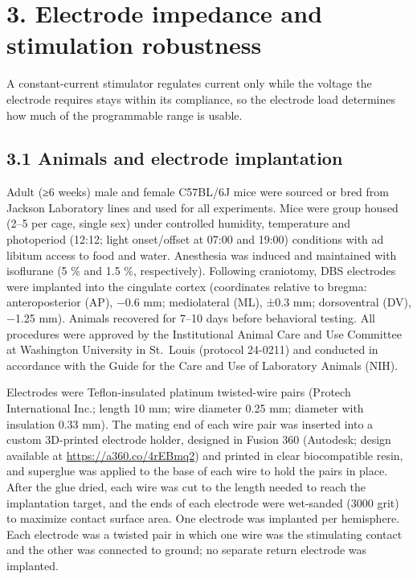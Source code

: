\section{3. Electrode impedance and stimulation robustness}\label{electrode-impedance-and-stimulation-robustness}

A constant-current stimulator regulates current only while the voltage the electrode requires stays within its compliance, so the electrode load determines how much of the programmable range is usable.

\subsection{3.1 Animals and electrode implantation}\label{animals-and-electrode-implantation}

Adult (≥6 weeks) male and female C57BL/6J mice were sourced or bred from Jackson Laboratory lines and used for all experiments. Mice were group housed (2--5 per cage, single sex) under controlled humidity, temperature and photoperiod (12:12; light onset/offset at 07:00 and 19:00) conditions with ad libitum access to food and water. Anesthesia was induced and maintained with isoflurane (5 \% and 1.5 \%, respectively). Following craniotomy, DBS electrodes were implanted into the cingulate cortex (coordinates relative to bregma: anteroposterior (AP), −0.6 mm; mediolateral (ML), ±0.3 mm; dorsoventral (DV), −1.25 mm). Animals recovered for 7--10 days before behavioral testing. All procedures were approved by the Institutional Animal Care and Use Committee at Washington University in St.~Louis (protocol 24-0211) and conducted in accordance with the Guide for the Care and Use of Laboratory Animals (NIH).

Electrodes were Teflon-insulated platinum twisted-wire pairs (Protech International Inc.; length 10 mm; wire diameter 0.25 mm; diameter with insulation 0.33 mm). The mating end of each wire pair was inserted into a custom 3D-printed electrode holder, designed in Fusion 360 (Autodesk; design available at \url{https://a360.co/4rEBmq2}) and printed in clear biocompatible resin, and superglue was applied to the base of each wire to hold the pairs in place. After the glue dried, each wire was cut to the length needed to reach the implantation target, and the ends of each electrode were wet-sanded (3000 grit) to maximize contact surface area. One electrode was implanted per hemisphere. Each electrode was a twisted pair in which one wire was the stimulating contact and the other was connected to ground; no separate return electrode was implanted.

